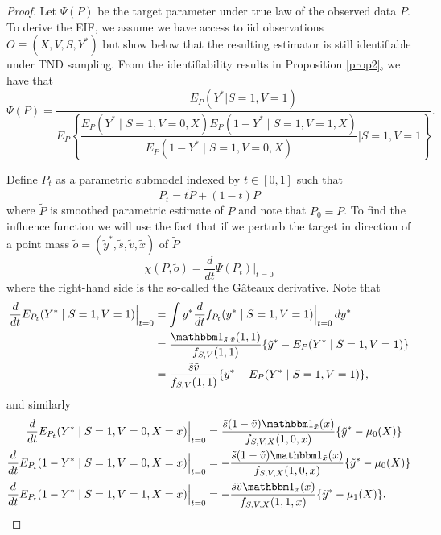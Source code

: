     \begin{proof}
    Let $\Psi(P)$ be the target parameter under true law of the observed data $P$. To derive the EIF, we assume we have access to iid observations $O \equiv (X, V, S, Y^*)$ but show below that the resulting estimator is still identifiable under TND sampling. From the identifiability results in Proposition \ref{prop2}, we have that 
    $$\Psi(P) = \dfrac{E_P(Y^*  | S = 1, V = 1)}{E_P\left\{\dfrac{E_P(Y^*\mid S=1, V=0, X)E_P(1 - Y^*\mid S=1, V=1, X)}{E_P(1 - Y^*\mid S=1, V=0, X)} \bigg| S=1, V=1\right\}}.$$ 
    
    Define $P_t$ as a parametric submodel indexed by $t \in [0,1]$ such that
    $$P_t = t \widetilde{P} + (1 - t)P$$
    where $\widetilde{P}$ is smoothed parametric estimate of $P$ and note that $P_0 = P$. To find the influence function we will use the fact that if we perturb the target in direction of a point mass $\widetilde{o} = (\widetilde{y}^*, \widetilde{s}, \widetilde{v}, \widetilde{x})$ of $\widetilde{P}$
    $$ \chi(P, \widetilde{o}) = \frac{d}{dt} \Psi(P_t)\bigg\vert_{t=0}$$
    where the right-hand side is the so-called the G\^{a}teaux derivative. Note that
    \begin{align*}
        \dfrac{d}{dt}E_{P_t}(Y^*\mid S=1, V=1)\Big\rvert_{t=0} &= \int y^* \dfrac{d}{dt}f_{P_t}(y^*\mid S=1, V=1)\Big\rvert_{t=0} \,dy^*\\
        &= \dfrac{\mathbbm 1_{\tilde s,\tilde v}(1, 1)}{f_{S, V}(1, 1)}\{\tilde y^* - E_P(Y^*\mid S=1, V=1)\}\\
        &= \dfrac{\tilde s\tilde v}{f_{S, V}(1, 1)}\{\tilde y^* - E_P(Y^*\mid S=1, V=1)\},
    \end{align*}
    and similarly
    \begin{align*}
        \dfrac{d}{dt}E_{P_t}(Y^*\mid S=1, V=0, X=x)\Big\rvert_{t=0} &= \dfrac{\tilde s(1-\tilde v)\mathbbm 1_{\tilde x}(x)}{f_{S, V, X}(1, 0, x)}\{\tilde y^* - \mu_0(X)\}\\
         \dfrac{d}{dt}E_{P_t}(1-Y^*\mid S=1, V=0, X=x)\Big\rvert_{t=0} &= -\dfrac{\tilde s(1-\tilde v)\mathbbm 1_{\tilde x}(x)}{f_{S, V, X}(1, 0, x)}\{\tilde y^* -\mu_0(X)\}\\
         \dfrac{d}{dt}E_{P_t}(1-Y^*\mid S=1, V=1, X=x)\Big\rvert_{t=0} &= -\dfrac{\tilde s\tilde v\mathbbm 1_{\tilde x}(x)}{f_{S, V, X}(1, 1, x)}\{\tilde y^* - \mu_1(X)\}.
    \end{align*}

\end{proof}
